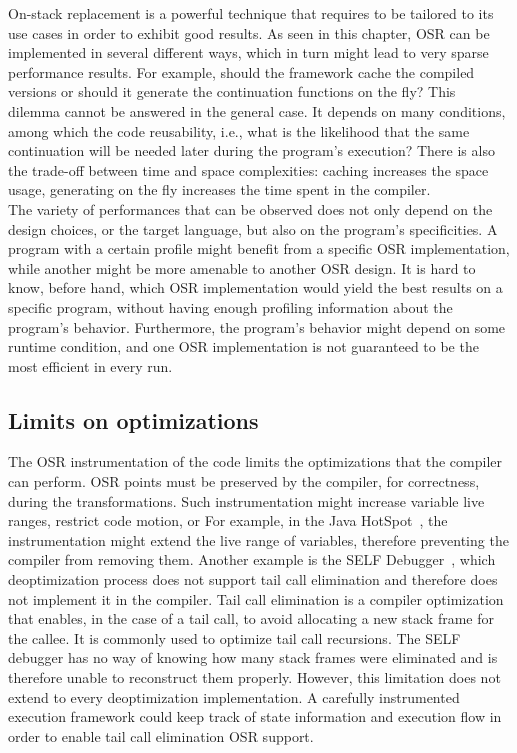 On-stack replacement is a powerful technique that requires to be tailored to its use cases in order to exhibit good results.
As seen in this chapter, OSR can be implemented in several different ways, which in turn might lead to very sparse performance results.
For example, should the framework cache the compiled versions or should it generate the continuation functions on the fly?
This dilemma cannot be answered in the general case.
It depends on many conditions, among which the code reusability, i.e., what is the likelihood that the same continuation will be needed later during the program's execution?
There is also the trade-off between time and space complexities: caching increases the space usage, generating on the fly increases the time spent in the compiler.\\

The variety of performances that can be observed does not only depend on the design choices, or the target language, but also on the program's specificities.
A program with a certain profile might benefit from a specific OSR implementation, while another might be more amenable to another OSR design.
It is hard to know, before hand, which OSR implementation would yield the best results on a specific program, without having enough profiling information about the program's behavior. 
Furthermore, the program's behavior might depend on some runtime condition, and one OSR implementation is not guaranteed to be the most efficient in every run.  

\subsection{Limits on optimizations}

The OSR instrumentation of the code limits the optimizations that the compiler can perform.
OSR points must be preserved by the compiler, for correctness, during the transformations.
Such instrumentation might increase variable live ranges, restrict code motion, or 
For example, in the Java HotSpot~\cite{paleczny2001java}, the instrumentation might extend the live range of variables, therefore preventing the compiler from removing them.
Another example is the SELF Debugger~\cite{holzle1992debugging}, which deoptimization process does not support tail call elimination and therefore does not implement it in the compiler.
Tail call elimination is a compiler optimization that enables, in the case of a tail call, to avoid allocating a new stack frame for the callee. 
It is commonly used to optimize tail call recursions.
The SELF debugger has no way of knowing how many stack frames were eliminated and is therefore unable to reconstruct them properly.
However, this limitation does not extend to every deoptimization implementation.
A carefully instrumented execution framework could keep track of state information and execution flow in order to enable tail call elimination OSR support.\\

